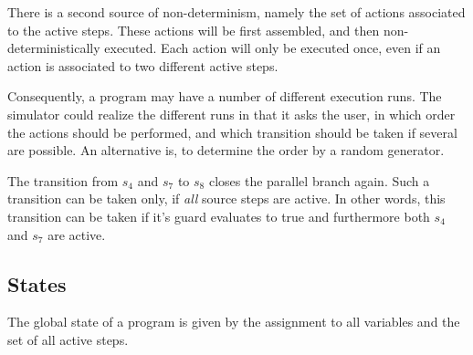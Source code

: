 There is a second source of non-determinism, namely the set of actions
associated to the active steps.  These actions will be first assembled, and
then non-deterministically executed.  Each action will only be executed once,
even if an action is associated to two different active steps.

Consequently, a program may have a number of different execution runs.  The
simulator could realize the different runs in that it asks the user, in which
order the actions should be performed, and which transition should be taken if
several are possible.  An alternative is, to determine the order by a random
generator.

The transition from $s_4$ and $s_7$ to $s_8$ closes the parallel branch again.
Such a transition can be taken only, if \emph{all} source steps are active. In
other words, this transition can be taken if it's guard evaluates to true and
furthermore both $s_4$ and $s_7$ are active.



\subsection{States}
\label{sec:states}

The global state of a program is given by the assignment to all variables and
the set of all active steps.



